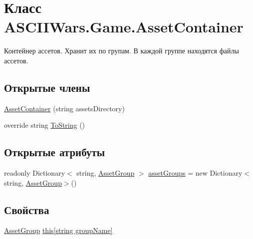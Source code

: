 \hypertarget{class_a_s_c_i_i_wars_1_1_game_1_1_asset_container}{}\section{Класс A\+S\+C\+I\+I\+Wars.\+Game.\+Asset\+Container}
\label{class_a_s_c_i_i_wars_1_1_game_1_1_asset_container}


Контейнер ассетов. Хранит их по групам. В каждой группе находятся файлы ассетов.  


\subsection*{Открытые члены}
\begin{DoxyCompactItemize}
\item 
\hyperlink{class_a_s_c_i_i_wars_1_1_game_1_1_asset_container_afb55a3f711d67504b677fc2bc38718cc}{Asset\+Container} (string assets\+Directory)
\item 
override string \hyperlink{class_a_s_c_i_i_wars_1_1_game_1_1_asset_container_a73cb91685f397df31d2a18d8b59b3093}{To\+String} ()
\end{DoxyCompactItemize}
\subsection*{Открытые атрибуты}
\begin{DoxyCompactItemize}
\item 
readonly Dictionary$<$ string, \hyperlink{class_a_s_c_i_i_wars_1_1_game_1_1_asset_group}{Asset\+Group} $>$ \hyperlink{class_a_s_c_i_i_wars_1_1_game_1_1_asset_container_afc2c4d42edc386fa6bdbf561546b2083}{asset\+Groups} = new Dictionary$<$string, \hyperlink{class_a_s_c_i_i_wars_1_1_game_1_1_asset_group}{Asset\+Group}$>$()
\end{DoxyCompactItemize}
\subsection*{Свойства}
\begin{DoxyCompactItemize}
\item 
\hyperlink{class_a_s_c_i_i_wars_1_1_game_1_1_asset_group}{Asset\+Group} \hyperlink{class_a_s_c_i_i_wars_1_1_game_1_1_asset_container_ae7149eab74d76098eca27b20d49d0bf9}{this\mbox{[}string group\+Name\mbox{]}}
\end{DoxyCompactItemize}


